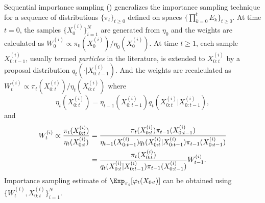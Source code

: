 \documentclass[11pt, fontset=Minion, showoverfull,
bib, biblatexstyle=numeric, mintcode, minted=cache]{marticle}
\begin{document}
Sequential importance sampling (\sis) generalizes the importance sampling
technique for a sequence of distributions $\{\pi_t\}_{t\ge0}$ defined on
spaces $\{\prod_{k=0}^tE_k\}_{t\ge0}$. At time $t = 0$, the samples
$\{X_0^{(i)}\}_{i=1}^N$ are generated from $\eta_0$ and the weights are
calculated as $W_0^{(i)} \propto \pi_0(X_0^{(i)})/\eta_0(X_0^{(i)})$. At time
$t\ge1$, each sample $X_{0:t-1}^{(i)}$, usually termed \emph{particles} in the
literature, is extended to $X_{0:t}^{(i)}$ by a proposal distribution
$q_t(\cdot|X_{0:t-1}^{(i)})$. And the weights are recalculated as $W_t^{(i)}
\propto \pi_t(X_{0:t}^{(i)})/\eta_t(X_{0:t}^{(i)})$ where
\begin{equation}
  \eta_t(X_{0:t}^{(i)}) =
  \eta_{t-1}(X_{0:t-1}^{(i)})q_t(X_{0:t}^{(i)}|X_{0:t-1}^{(i)}),
\end{equation}
and
\begin{align}
  W_t^{(i)} \propto \frac{\pi_t(X_{0:t}^{(i)})}{\eta_t(X_{0:t}^{(i)})}
  &= \frac{\pi_t(X_{0:t}^{(i)})\pi_{t-1}(X_{0:t-1}^{(i)})}
  {\eta_{t-1}(X_{0:t-1}^{(i)})q_t(X_{0:t}^{(i)}|X_{0:t-1}^{(i)})
    \pi_{t-1}(X_{0:t-1}^{(i)})} \notag\\
  &= \frac{\pi_t(X_{0:t}^{(i)})}
  {q_t(X_{0:t}^{(i)}|X_{0:t-1}^{(i)})\pi_{t-1}(X_{0:t-1}^{(i)})}W_{t-1}^{(i)}.
  \label{eq:si}
\end{align}
Importance sampling estimate of $\Exp_{\pi_t}[\varphi_t(X_{0:t})]$ can be
obtained using $\{W_t^{(i)},X_{0:t}^{(i)}\}_{i=1}^N$.
\end{document}
